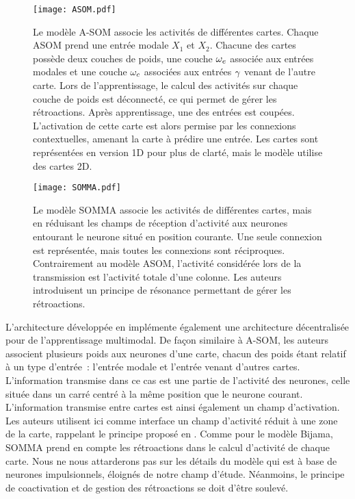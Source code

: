 \documentclass[../main]{subfiles}
\begin{document}
\begin{figure}
    \centering\texttt{[image: ASOM.pdf]}
    \caption{Le modèle A-SOM \cite{johnsson_associative_2009} associe les activités de différentes cartes. Chaque ASOM prend une entrée modale $X_1$ et $X_2$. Chacune des cartes possède deux couches de poids, une couche $\omega_e$ associée aux entrées modales et une couche $\omega_c$ associées aux entrées $\gamma$ venant de l'autre carte. Lors de l'apprentissage, le calcul des activités sur chaque couche de poids est déconnecté, ce qui permet de gérer les rétroactions. 
    Après apprentissage, une des entrées est coupées. L'activation de cette carte est alors permise par les connexions contextuelles, amenant la carte à prédire une entrée. Les cartes sont représentées en version 1D pour plus de clarté, mais le modèle utilise des cartes 2D.
    \label{fig:asom}}
\end{figure}

\begin{figure}
    \centering\texttt{[image: SOMMA.pdf]}
    \caption{Le modèle SOMMA \cite{lefort_unlearning_2011,lefort_apprentissage_2012} associe les activités de différentes cartes, mais en réduisant les champs de réception d'activité aux neurones entourant le neurone situé en position courante. Une seule connexion est représentée, mais toutes les connexions sont réciproques. Contrairement au modèle ASOM, l'activité considérée lors de la transmission est l'activité totale d'une colonne. Les auteurs introduisent un principe de résonance permettant de gérer les rétroactions.
    \label{fig:somma}}
\end{figure}

L'architecture développée en \cite{lefort_active_2015} implémente également une architecture décentralisée pour de l'apprentissage multimodal. De façon similaire à A-SOM, les auteurs associent plusieurs poids aux neurones d'une carte, chacun des poids étant relatif à un type d'entrée~: l'entrée modale et l'entrée venant d'autres cartes. L'information transmise dans ce cas est une partie de l'activité des neurones, celle située dans un carré centré à la même position que le neurone courant. L'information transmise entre cartes est ainsi également un champ d'activation. Les auteurs utilisent ici comme interface un champ d'activité réduit à une zone de la carte, rappelant le principe proposé en \cite{menard05}. Comme pour le modèle Bijama, SOMMA prend en compte les rétroactions dans le calcul d'activité de chaque carte.
Nous ne nous attarderons pas sur les détails du modèle qui est à base de neurones impulsionnels, éloignés de notre champ d'étude. Néanmoins, le principe de coactivation et de gestion des rétroactions se doit d'être soulevé. 
\end{document}
